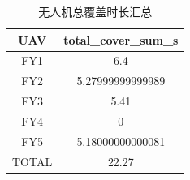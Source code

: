 \documentclass[withoutpreface,bwprint]{cumcmthesis} %
\begin{document}
\begin{table}[h]
    \centering
    \caption{无人机总覆盖时长汇总}
    \label{tab:summary}
    \begin{tabular}{cc}
        \toprule[1.5pt]
        UAV & total\_cover\_sum\_s \\
        \midrule[1pt]
        FY1 & 6.4 \\
        FY2 & 5.27999999999989 \\
        FY3 & 5.41 \\
        FY4 & 0 \\
        FY5 & 5.18000000000081 \\
        \midrule[1pt]
        TOTAL & 22.27 \\
        \bottomrule[1.5pt]
    \end{tabular}
\end{table}
\end{document}

